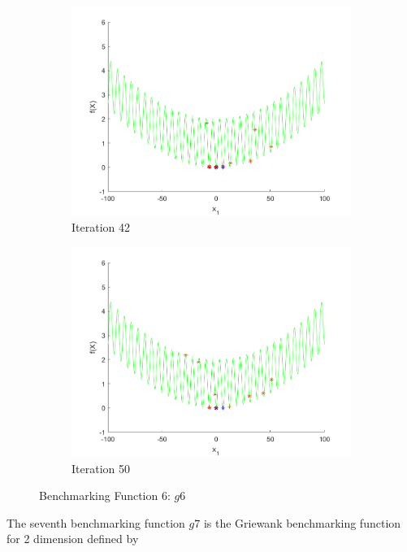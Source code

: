 \begin{figure}
\begin{subfigure}[b]{0.4\textwidth}
   \includegraphics[width=\textwidth]{img/smpl/grwnk1d/loa-iter-42}
   \caption{Iteration 42}
   \label{fig:s3-iter-6}
 \end{subfigure}
 \begin{subfigure}[b]{0.4\textwidth}
   \includegraphics[width=\textwidth]{img/smpl/grwnk1d/loa-iter-50}
   \caption{Iteration 50}
   \label{fig:s3-iter-7}
 \end{subfigure}
 \caption{Benchmarking Function 6: $g6$}
\end{figure}

\par The seventh benchmarking function $g7$ is the Griewank benchmarking function for 2 dimension defined by

